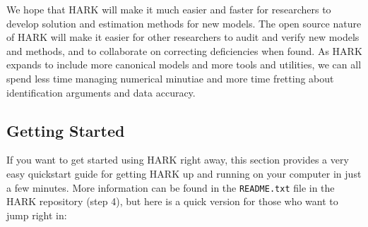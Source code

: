 \documentclass[12pt,titlepage,letterpaper]{econtex}
\begin{document}
We hope that HARK will make it much easier and faster for researchers to develop solution and estimation methods for new models.  The open source nature of HARK will make it easier for other researchers to audit and verify new models and methods, and to collaborate on correcting deficiencies when found.  As HARK expands to include more canonical models and more tools and utilities, we can all spend less time managing numerical minutiae and more time fretting about identification arguments and data accuracy.

\subsection{Getting Started}\label{sec:GettingStarted}

If you want to get started using HARK right away, this section provides a very easy quickstart guide for getting HARK up and running on your computer in just a few minutes.  More information can be found in the \texttt{README.txt} file in the HARK repository (step 4), but here is a quick version for those who want to jump right in:
\end{document}
